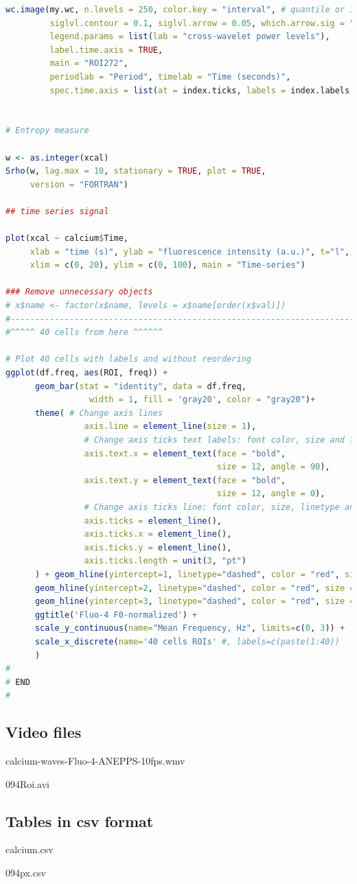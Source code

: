 \documentclass{biophys-new}
\begin{document}
\begin{lstlisting}[language=R]
wc.image(my.wc, n.levels = 250, color.key = "interval", # quantile or interval
         siglvl.contour = 0.1, siglvl.arrow = 0.05, which.arrow.sig = "wt",
         legend.params = list(lab = "cross-wavelet power levels"),
         label.time.axis = TRUE,
         main = "ROI272",
         periodlab = "Period", timelab = "Time (seconds)",
         spec.time.axis = list(at = index.ticks, labels = index.labels.rounded))


# Entropy measure

w <- as.integer(xcal)
Srho(w, lag.max = 10, stationary = TRUE, plot = TRUE,
     version = "FORTRAN")

## time series signal

plot(xcal ~ calcium$Time,
     xlab = "time (s)", ylab = "fluorescence intensity (a.u.)", t="l",
     xlim = c(0, 20), ylim = c(0, 100), main = "Time-series")

### Remove unnecessary objects
# x$name <- factor(x$name, levels = x$name[order(x$val)])
#---------------------------------------------------------------------------
#^^^^^ 40 cells from here ^^^^^^

# Plot 40 cells with labels and without reordering
ggplot(df.freq, aes(ROI, freq)) +
      geom_bar(stat = "identity", data = df.freq,
                 width = 1, fill = 'gray20', color = "gray20")+
      theme( # Change axis lines
                axis.line = element_line(size = 1),
                # Change axis ticks text labels: font color, size and face
                axis.text.x = element_text(face = "bold",
                                           size = 12, angle = 90),
                axis.text.y = element_text(face = "bold",
                                           size = 12, angle = 0),
                # Change axis ticks line: font color, size, linetype and length
                axis.ticks = element_line(),
                axis.ticks.x = element_line(),
                axis.ticks.y = element_line(),
                axis.ticks.length = unit(3, "pt")
      ) + geom_hline(yintercept=1, linetype="dashed", color = "red", size = 1) +
      geom_hline(yintercept=2, linetype="dashed", color = "red", size = 1) +
      geom_hline(yintercept=3, linetype="dashed", color = "red", size = 1) +
      ggtitle('Fluo-4 F0-normalized') +
      scale_y_continuous(name="Mean Frequency, Hz", limits=c(0, 3)) +
      scale_x_discrete(name='40 cells ROIs' #, labels=c(paste(1:40))
      )
#
# END
#
\end{lstlisting}

\subsection*{Video files}

calcium-waves-Fluo-4-ANEPPS-10fps.wmv

094Roi.avi

\subsection*{Tables in csv format}

calcium.csv

094px.csv

\end{document}
